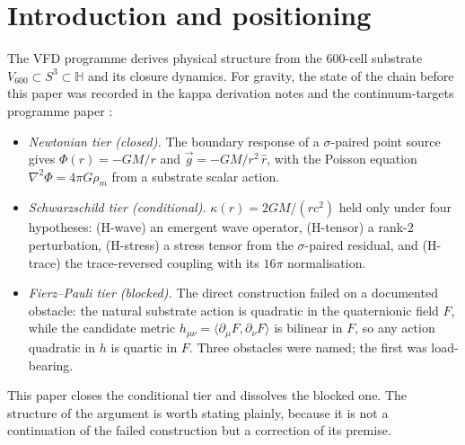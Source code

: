 \documentclass[12pt]{article}
\theoremstyle{definition}
\theoremstyle{remark}
\newcommand{\Hq}{\mathbb{H}}
\begin{document}
\begin{abstract}
All 39 verification items pass, each with a genuine falsifiable null. The remaining gaps are rigor-grade, not mechanism-grade: the strict discrete-to-continuum limit (the Paper~XL programme), the Gaussian-regime restriction, and the imported classical bootstrap theorems.
\end{abstract}

\section{Introduction and positioning}\label{sec:intro}

The VFD programme derives physical structure from the 600-cell substrate $V_{600} \subset S^3 \subset \Hq$ and its closure dynamics. For gravity, the state of the chain before this paper was recorded in the kappa derivation notes \citep{SmartKappa} and the continuum-targets programme paper \citep{SmartXL}:

\begin{itemize}
\item \emph{Newtonian tier (closed).} The boundary response of a $\sigma$-paired point source gives $\Phi(r) = -GM/r$ and $\vec g = -GM/r^2\,\hat r$, with the Poisson equation $\nabla^2\Phi = 4\pi G\rho_m$ from a substrate scalar action.
\item \emph{Schwarzschild tier (conditional).} $\kappa(r) = 2GM/(rc^2)$ held only under four hypotheses: (H-wave) an emergent wave operator, (H-tensor) a rank-2 perturbation, (H-stress) a stress tensor from the $\sigma$-paired residual, and (H-trace) the trace-reversed coupling with its $16\pi$ normalisation.
\item \emph{Fierz--Pauli tier (blocked).} The direct construction failed on a documented obstacle: the natural substrate action is quadratic in the quaternionic field $F$, while the candidate metric $h_{\mu\nu} = \langle\partial_\mu F, \partial_\nu F\rangle$ is bilinear in $F$, so any action quadratic in $h$ is quartic in $F$. Three obstacles were named; the first was load-bearing.
\end{itemize}

This paper closes the conditional tier and dissolves the blocked one. The structure of the argument is worth stating plainly, because it is not a continuation of the failed construction but a correction of its premise.
\end{document}
